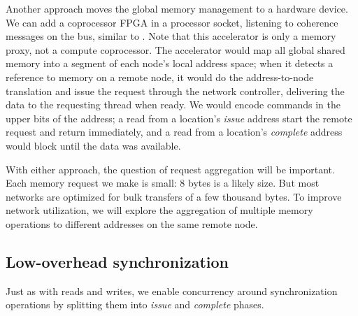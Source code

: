 \documentclass[10pt,nocopyrightspace,preprint]{sigplanconf}
\begin{document}

Another approach moves the global memory management to a hardware
device. We can add a coprocessor FPGA in a processor socket, listening
to coherence messages on the bus, similar to \cite{mogill}. Note that
this accelerator is only a memory proxy, not a compute
coprocessor. The accelerator would map all global shared memory into a
segment of each node's local address space; when it detects a
reference to memory on a remote node, it would do the address-to-node
translation and issue the request through the network controller,
delivering the data to the requesting thread when ready. We would
encode commands in the upper bits of the address; a read from a
location's {\em issue} address start the remote request and return
immediately, and a read from a location's {\em complete} address would
block until the data was available.



With either approach, the question of request aggregation will be
important. Each memory request we make is small: 8 bytes is a likely
size. But most networks are optimized for bulk transfers of a few
thousand bytes. To improve network utilization, we will explore the
aggregation of multiple memory operations to different addresses on
the same remote node. 


\subsection{Low-overhead synchronization}

Just as with reads and writes, we enable concurrency around
synchronization operations by splitting them into {\em issue} and {\em
  complete} phases.
\end{document}

